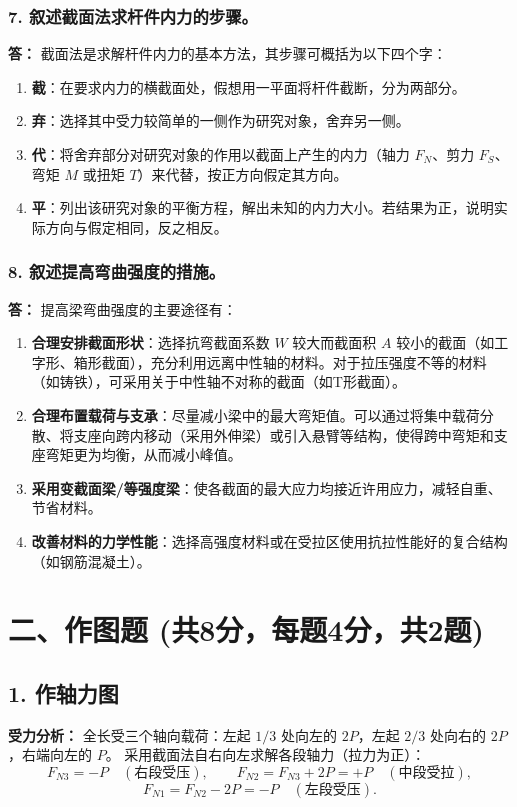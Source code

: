 \documentclass[11pt,a4paper]{ctexrep}
\begin{document}
{\subsubsection*{7. 叙述截面法求杆件内力的步骤。}
\textbf{答：} 截面法是求解杆件内力的基本方法，其步骤可概括为以下四个字：
\begin{enumerate}
    \item \textbf{截}：在要求内力的横截面处，假想用一平面将杆件截断，分为两部分。
    \item \textbf{弃}：选择其中受力较简单的一侧作为研究对象，舍弃另一侧。
    \item \textbf{代}：将舍弃部分对研究对象的作用以截面上产生的内力（轴力 $F_N$、剪力 $F_S$、弯矩 $M$ 或扭矩 $T$）来代替，按正方向假定其方向。
    \item \textbf{平}：列出该研究对象的平衡方程，解出未知的内力大小。若结果为正，说明实际方向与假定相同，反之相反。
\end{enumerate}

\subsubsection*{8. 叙述提高弯曲强度的措施。}
\textbf{答：} 提高梁弯曲强度的主要途径有：
\begin{enumerate}
    \item \textbf{合理安排截面形状}：选择抗弯截面系数 $W$ 较大而截面积 $A$ 较小的截面（如工字形、箱形截面），充分利用远离中性轴的材料。对于拉压强度不等的材料（如铸铁），可采用关于中性轴不对称的截面（如T形截面）。
    \item \textbf{合理布置载荷与支承}：尽量减小梁中的最大弯矩值。可以通过将集中载荷分散、将支座向跨内移动（采用外伸梁）或引入悬臂等结构，使得跨中弯矩和支座弯矩更为均衡，从而减小峰值。
    \item \textbf{采用变截面梁/等强度梁}：使各截面的最大应力均接近许用应力，减轻自重、节省材料。
    \item \textbf{改善材料的力学性能}：选择高强度材料或在受拉区使用抗拉性能好的复合结构（如钢筋混凝土）。
\end{enumerate}




\section*{二、作图题 (共8分，每题4分，共2题)}

\subsection*{1. 作轴力图}
\textbf{受力分析：}
全长受三个轴向载荷：左起 $1/3$ 处向左的 $2P$，左起 $2/3$ 处向右的 $2P$，右端向左的 $P$。
采用截面法自右向左求解各段轴力（拉力为正）：
\[
F_{N3}=-P\quad(\text{右段受压}),\qquad
F_{N2}=F_{N3}+2P=+P\quad(\text{中段受拉}),
\]
\[
F_{N1}=F_{N2}-2P=-P\quad(\text{左段受压}).
\]

}
\end{document}
